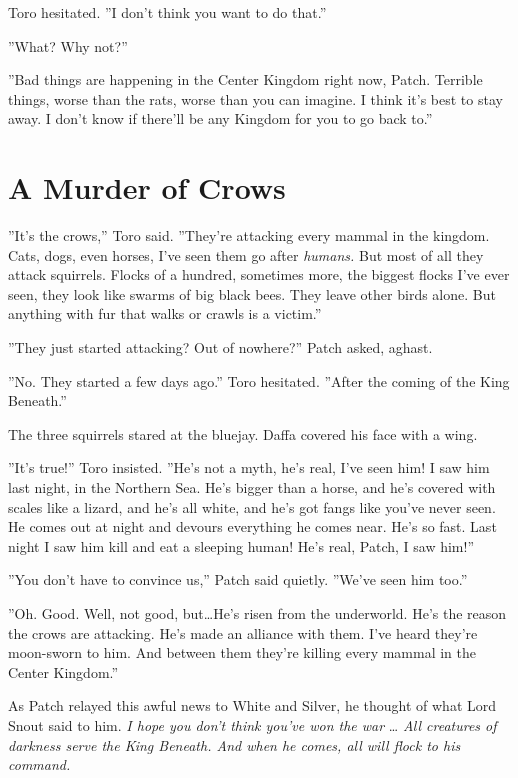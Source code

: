 \documentclass[12pt]{book}
\begin{document}
Toro hesitated. ''I don't think you want to do that.''

''What? Why not?''

''Bad things are happening in the Center Kingdom right now,
Patch. Terrible things, worse than the rats, worse than you can
imagine. I think it's best to stay away. I don't know if there'll be
any Kingdom for you to go back to.''


\section{A Murder of Crows}

''It's the crows,'' Toro said. ''They're attacking every mammal in the
kingdom. Cats, dogs, even horses, I've seen them go after
\textit{humans.} But most of all they attack squirrels. Flocks of a
hundred, sometimes more, the biggest flocks I've ever seen, they look
like swarms of big black bees. They leave other birds alone. But
anything with fur that walks or crawls is a victim.''

''They just started attacking? Out of nowhere?'' Patch asked, aghast.

''No. They started a few days ago.'' Toro hesitated. ''After the
coming of the King Beneath.''

The three squirrels stared at the bluejay. Daffa covered his face with
a wing.

''It's true!'' Toro insisted. ''He's not a myth, he's real, I've seen
him! I saw him last night, in the Northern Sea. He's bigger than a
horse, and he's covered with scales like a lizard, and he's all white,
and he's got fangs like you've never seen. He comes out at night and
devours everything he comes near. He's so fast. Last night I saw him
kill and eat a sleeping human! He's real, Patch, I saw him!''

''You don't have to convince us,'' Patch said quietly. ''We've seen
him too.''

''Oh. Good. Well, not good, but\ldots{}He's risen from the
underworld. He's the reason the crows are attacking. He's made an
alliance with them. I've heard they're moon-sworn to him. And between
them they're killing every mammal in the Center Kingdom.''

As Patch relayed this awful news to White and Silver, he thought of
what Lord Snout said to him. \textit{I hope you don't think you've won
the war} \ldots{} \textit{All creatures of darkness serve the King
Beneath. And when he comes, all will flock to his command.}
\end{document}
